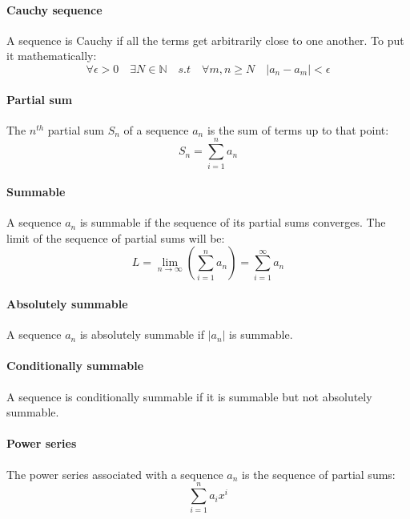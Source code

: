 \documentclass{scrartcl}
\newcommand{\N}{\mathbb{N}}
\begin{document}
\paragraph{Cauchy sequence}
A sequence is Cauchy if all the terms get arbitrarily close to one another. To put it mathematically:
\begin{equation}
\forall \epsilon > 0 \quad \exists N \in \N \quad s.t \quad \forall m,n \geq N \quad |a_{n} - a_{m}| < \epsilon
\end{equation}

\paragraph{Partial sum}
The $ n^{th} $ partial sum $ S_{n} $ of a sequence $ a_{n} $ is the sum of terms up to that point:
\begin{equation}
S_{n} = \sum_{i=1}^{n} a_{n}
\end{equation}

\paragraph{Summable}
A sequence $ a_n $ is summable if the sequence of its partial sums converges. The limit of the sequence of partial sums will be:
\begin{equation}
L = \lim_{n \to \infty} (\sum_{i=1}^{n} a_{n}) = \sum_{i=1}^{\infty} a_{n}
\end{equation}

\paragraph{Absolutely summable}
A sequence $ a_{n} $ is absolutely summable if $ |a_{n}| $ is summable.

\paragraph{Conditionally summable}
A sequence is conditionally summable if it is summable but not absolutely summable.

\paragraph{Power series}
The power series associated with a sequence $ a_{n} $ is the sequence of partial sums:
\begin{equation}
\sum_{i=1}^{n} a_{i}x^{i}
\end{equation}
\end{document}

